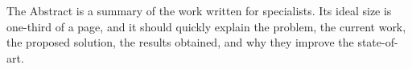 
The Abstract is a summary of the work written for specialists.
Its ideal size is one-third of a page, and it should quickly explain the
problem, the current work, the proposed solution, the results obtained, and
why they improve the state-of-art.